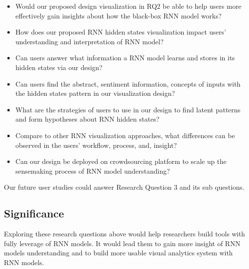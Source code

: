 \begin{itemize}
    \item Would our proposed design visualization in RQ2 be able to help users more effectively gain insights about how the black-box RNN model works? 
    \item How does our proposed RNN hidden states visualization impact users’ understanding and interpretation of RNN model?
    \item Can users answer what information a RNN model learns and stores in its hidden states via our design?
    \item Can users find the abstract, sentiment information, concepts of inputs with the hidden states pattern in our visualization design?
    \item What are the strategies of users to use in our design to find latent patterns and form hypotheses about RNN hidden states?
    \item Compare to other RNN visualization approaches\cite{Strobelt2016}, what differences can be observed in the users’ workflow, process, and, insight?
    \item Can our design be deployed on crowdsourcing platform to scale up the sensemaking process of RNN model understanding?

\end{itemize}

Our future user studies could answer Research Question 3 and its sub questions. 

\subsection{Significance}


Exploring these research questions above would help researchers build tools with fully leverage of RNN models. It would lead them to gain more insight of RNN models understanding and to build more usable visual analytics system with RNN models. 

%  
%
%    





